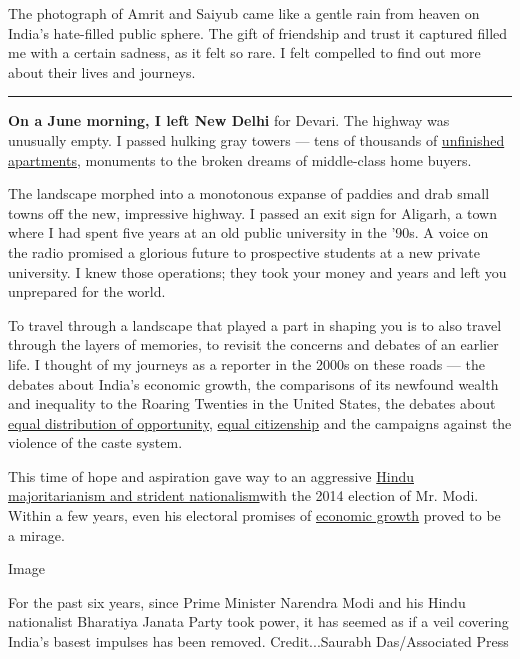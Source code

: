The photograph of Amrit and Saiyub came like a gentle rain from heaven
on India's hate-filled public sphere. The gift of friendship and trust
it captured filled me with a certain sadness, as it felt so rare. I felt
compelled to find out more about their lives and journeys.

\begin{center}\rule{0.5\linewidth}{\linethickness}\end{center}

\textbf{On a June morning, I left New Delhi} for Devari. The highway was
unusually empty. I passed hulking gray towers --- tens of thousands of
\href{https://www.wsj.com/articles/indias-ghost-towns-saddle-middle-class-with-debtand-broken-dreams-11579189678}{unfinished
apartments}, monuments to the broken dreams of middle-class home buyers.

The landscape morphed into a monotonous expanse of paddies and drab
small towns off the new, impressive highway. I passed an exit sign for
Aligarh, a town where I had spent five years at an old public university
in the '90s. A voice on the radio promised a glorious future to
prospective students at a new private university. I knew those
operations; they took your money and years and left you unprepared for
the world.

To travel through a landscape that played a part in shaping you is to
also travel through the layers of memories, to revisit the concerns and
debates of an earlier life. I thought of my journeys as a reporter in
the 2000s on these roads --- the debates about India's economic growth,
the comparisons of its newfound wealth and inequality to the Roaring
Twenties in the United States, the debates about
\href{http://www.sacw.net/index.php?page=imprimir_articulo\&id_article=6295}{equal
distribution of opportunity},
\href{https://caravanmagazine.in/reportage/road-back-ayodhya}{equal
citizenship} and the campaigns against the violence of the caste system.

This time of hope and aspiration gave way to an aggressive
\href{https://www.theguardian.com/books/2014/may/16/what-next-india-pankaj-mishra}{Hindu
majoritarianism and strident nationalism}with the 2014 election of Mr.
Modi. Within a few years, even his electoral promises of
\href{https://www.nytimes3xbfgragh.onion/2019/02/01/opinion/india-unemployment-jobs-blackout.html}{economic
growth} proved to be a mirage.

Image

For the past six years, since Prime Minister Narendra Modi and his Hindu
nationalist Bharatiya Janata Party took power, it has seemed as if a
veil covering India's basest impulses has been removed. Credit...Saurabh
Das/Associated Press

